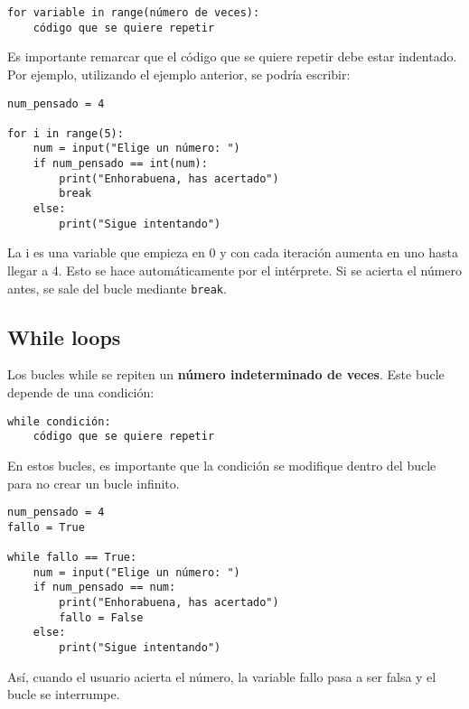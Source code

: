 \begin{lstlisting}
for variable in range(número de veces):
	código que se quiere repetir
\end{lstlisting}

Es importante remarcar que el código que se quiere repetir debe estar indentado. Por ejemplo, utilizando el ejemplo anterior, se podría escribir:

\begin{lstlisting}
num_pensado = 4

for i in range(5):
	num = input("Elige un número: ")
	if num_pensado == int(num):
		print("Enhorabuena, has acertado")
		break
	else:
		print("Sigue intentando")
\end{lstlisting}

La i es una variable que empieza en 0 y con cada iteración aumenta en uno hasta llegar a 4. Esto se hace automáticamente por el intérprete. Si se acierta el número antes, se sale del bucle mediante \texttt{break}.

\subsection{While loops}
Los bucles while se repiten un \textbf{número indeterminado de veces}. Este bucle depende de una condición:

\begin{lstlisting}
while condición:
	código que se quiere repetir
\end{lstlisting}

En estos bucles, es importante que la condición se modifique dentro del bucle para no crear un bucle infinito. 

\begin{lstlisting}
num_pensado = 4
fallo = True

while fallo == True:
	num = input("Elige un número: ")
	if num_pensado == num:
		print("Enhorabuena, has acertado")
		fallo = False
	else:
		print("Sigue intentando")
\end{lstlisting}
Así, cuando el usuario acierta el número, la variable fallo pasa a ser falsa y el bucle se interrumpe.